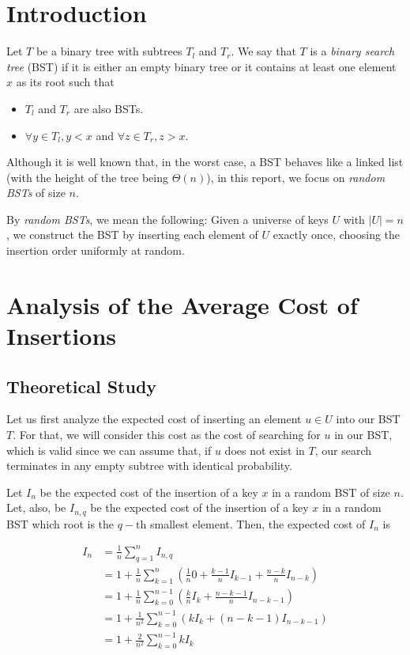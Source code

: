 \section{Introduction}  
Let $T$ be a binary tree with subtrees $T_l$ and $T_r$. We say that $T$ is a \textit{binary search tree} (BST) if it is either an empty binary tree or it contains at least one element $x$ as its root such that  

\begin{itemize}  
    \item $T_l$ and $T_r$ are also BSTs.  
    \item $\forall y \in T_l, y < x$ and $\forall z \in T_r, z > x$.  
\end{itemize}  

Although it is well known that, in the worst case, a BST behaves like a linked list (with the height of the tree being $\Theta(n)$), in this report, we focus on \textit{random BSTs} of size $n$.  

By \textit{random BSTs}, we mean the following: Given a universe of keys $U$ with $|U| = n$, we construct the BST by inserting each element of $U$ exactly once, choosing the insertion order uniformly at random.

\section{Analysis of the Average Cost of Insertions}
\subsection{Theoretical Study}
Let us first analyze the expected cost of inserting an element \( u \in U \) into our BST \( T \). For that, we will consider this cost as the cost of searching for \( u \) in our BST, which is valid since we can assume that, if $u$ does not exist in $T$, our search terminates in any empty subtree with identical probability. 

Let $I_n$ be the expected cost of the insertion of a key $x$ in a random BST of size $n$. Let, also, be $I_{n,q}$ be the expected cost of the insertion of a key $x$ in a random BST which root is the $q-\text{th}$ smallest element. Then, the expected cost of $I_n$ is

\begin{align*}
    I_n &= \frac{1}{n}\sum\limits_{q = 1}^{n} I_{n,q} \\
        &= 1 + \frac{1}{n}\sum\limits_{k=1}^{n} (\frac{1}{n} 0 + \frac{k-1}{n} I_{k-1} + \frac{n-k}{n} I_{n-k}) \\
        &= 1 + \frac{1}{n}\sum\limits_{k=0}^{n-1} (\frac{k}{n} I_{k} + \frac{n-k-1}{n} I_{n-k-1}) \\
        &= 1 + \frac{1}{n^2}\sum\limits_{k=0}^{n-1} (k I_{k} + (n-k-1)I_{n-k-1}) \\
        &= 1 + \frac{2}{n^2}\sum\limits_{k=0}^{n-1} k I_{k}
\end{align*}

